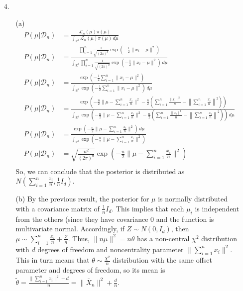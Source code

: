 \documentclass[11pt]{article}
\newcommand{\R}{\mathbb{R}}
\theoremstyle{definition}
\begin{document}
\begin{itemize}
\begin{itemize}
        \end{itemize}
    \item[4.]
        \begin{itemize}
            \item[(a)]
                \begin{align*}
                    P(\mu \vert \mathcal{D}_n) &= \frac{\mathcal{L}_n(\mu) \pi(\mu)}{\int_{\R^d}\mathcal{L}_n(\mu) \pi(\mu) \, d\mu} \\
                    P(\mu \vert \mathcal{D}_n) &= \frac{\prod_{i=1}^n \frac{1}{\sqrt{(2\pi)^d}}\exp\left(-\frac{1}{2}\|x_i-\mu\|^2\right)}{\int_{\R^d}\prod_{i=1}^n\frac{1}{\sqrt{(2\pi)^d}} \exp\left(-\frac{1}{2}\|x_i-\mu\|^2\right) \, d\mu}  \\
                    P(\mu \vert \mathcal{D}_n) &= \frac{ \exp\left(-\frac{1}{2}\sum_{i=1}^n\|x_i-\mu\|^2\right)}{\int_{\R^d}\exp\left(-\frac{1}{2}\sum_{i=1}^n\|x_i-\mu\|^2\right) \, d\mu}  \\
                    P(\mu \vert \mathcal{D}_n) &= \frac{ \exp\left(-\frac{n}{2}\|\mu-\sum_{i=1}^n\frac{x_i}{n}\|^2 -\frac{n}{2}\left(\sum_{i=1}^n\frac{\|x_i\|^2}{n}-\left\|\sum_{i=1}^n\frac{x_i}{n}\right\|^2\right)\right)}{\int_{\R^d}\exp\left(-\frac{n}{2}\|\mu-\sum_{i=1}^n\frac{x_i}{n}\|^2 -\frac{n}{2}\left(\sum_{i=1}^n\frac{\|x_i\|^2}{n}-\left\|\sum_{i=1}^n\frac{x_i}{n}\right\|^2\right)\right) \, d\mu}  \\
                    P(\mu \vert \mathcal{D}_n) &= \frac{ \exp\left(-\frac{n}{2}\|\mu-\sum_{i=1}^n\frac{x_i}{n}\|^2\right)  \, d\mu}{\int_{\R^d}\exp\left(-\frac{n}{2}\|\mu-\sum_{i=1}^n\frac{x_i}{n}\|^2\right)}  \\
                    P(\mu \vert \mathcal{D}_n) &= \sqrt{\frac{n^d}{(2\pi)^d}} \exp\left(-\frac{n}{2}\|\mu-\sum_{i=1}^n\frac{x_i}{n}\|^2\right) \\
                \end{align*}
                So, we can conclude that the posterior is distributed as \(N\left(\sum_{i=1}^n\frac{x_i}{n},\frac{1}{n}I_d\right)\).
        \item[(b)]
                By the previous result, the posterior for $\mu$ is normally distributed with a covariance matrix of $\frac{1}{n}I_d$. This implies that each $\mu_i$ is independent from the others (since they have covariance $0$ and the function is multivariate normal. Accordingly, if $Z\sim N(0,I_d)$, then \(\mu \sim \sum_{i=1}^n\frac{x_i}{n}+\frac{Z}{n}\). Thus, $\|n\mu\|^2=n\theta$ has a non-central $\chi^2$ distribution with $d$ degrees of freedom and noncentrality parameter \(\|\sum_{i=1}^n{x_i}\|^2\). This in turn means that $\theta\sim \frac{\chi^2}{n}$ distribution with the same offset parameter and degrees of freedom, so its mean is \(\tilde\theta=\frac{\|\sum_{i=1}^n{x_i}\|^2+d}{n}=\|\bar X_n\|^2 + \frac{d}{n}\).

\end{itemize}
\end{itemize}
\end{document}
